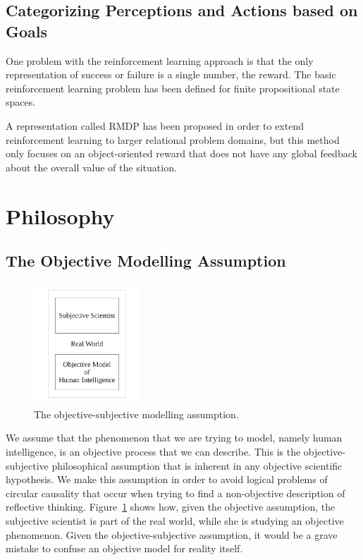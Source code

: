 \subsection{Categorizing Perceptions and Actions based on Goals}

One problem with the reinforcement learning approach is that the only
representation of success or failure is a single number, the reward.
The basic reinforcement learning problem has been defined for finite
propositional state spaces.

A representation called \ac{RMDP} has been proposed
\citep{guestrin:2003} in order to extend reinforcement learning to
larger relational problem domains, but this method only focuses on an
object-oriented reward that does not have any global feedback about
the overall value of the situation.


\section{Philosophy}

\subsection{The Objective Modelling Assumption}

\begin{figure}[bth]
  \center
  \includegraphics[width=4cm]{gfx/objective_description}
  \caption[The objective-subjective modelling assumption]{The objective-subjective modelling assumption.}
  \label{fig:objective_description}
\end{figure}

We assume that the phenomenon that we are trying to model, namely
human intelligence, is an objective process that we can describe.
This is the objective-subjective philosophical assumption that is
inherent in any objective scientific hypothesis.  We make this
assumption in order to avoid logical problems of circular causality
that occur when trying to find a non-objective description of
reflective thinking.  Figure~\ref{fig:objective_description} shows
how, given the objective assumption, the subjective scientist is part
of the real world, while she is studying an objective phenomenon.
Given the objective-subjective assumption, it would be a grave mistake
to confuse an objective model for reality itself.

